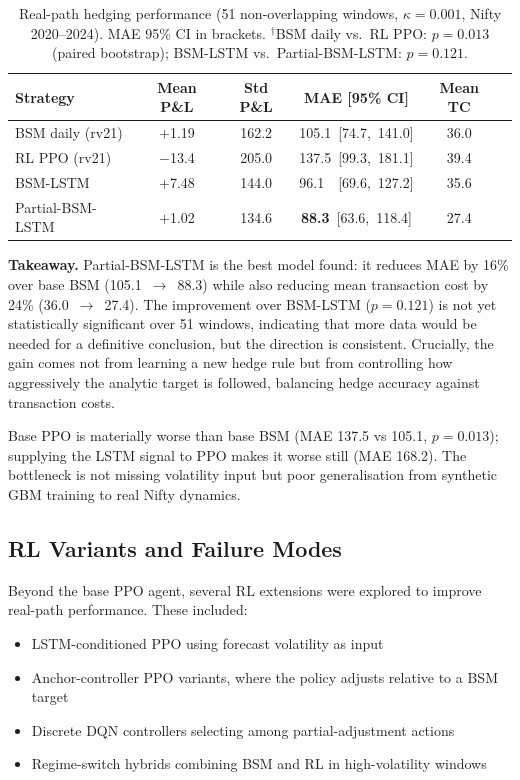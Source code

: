 \documentclass[10pt,a4paper]{article}
\begin{document}
\begin{table}[H]
\centering
\caption{Real-path hedging performance (51 non-overlapping windows,
         $\kappa=0.001$, Nifty 2020--2024).
         MAE 95\% CI in brackets.
         $^\dagger$BSM daily vs.\ RL PPO: $p=0.013$ (paired bootstrap);
         BSM-LSTM vs.\ Partial-BSM-LSTM: $p=0.121$.}
\label{tab:real}
\begin{tabular}{lccccc}
\toprule
Strategy & Mean P\&L & Std P\&L & MAE [95\% CI] & Mean TC \\
\midrule
BSM daily (rv21)  & $+$1.19  & 162.2 & 105.1\ [74.7,\ 141.0] & 36.0 \\
RL PPO (rv21)     & $-$13.4  & 205.0 & 137.5\ [99.3,\ 181.1] & 39.4 \\
BSM-LSTM          & $+$7.48  & 144.0 & 96.1\ \ [69.6,\ 127.2] & 35.6 \\
Partial-BSM-LSTM  & $+$1.02  & 134.6 & \textbf{88.3}\ [63.6,\ 118.4] & 27.4 \\
\bottomrule
\end{tabular}
\end{table}

\textbf{Takeaway.} Partial-BSM-LSTM is the best model found: it reduces MAE
by 16\% over base BSM (105.1~$\to$~88.3) while also reducing mean transaction cost
by 24\% (36.0~$\to$~27.4).  The improvement over BSM-LSTM ($p=0.121$) is not
yet statistically significant over 51 windows, indicating that more data would
be needed for a definitive conclusion, but the direction is consistent.
Crucially, the gain comes not from learning a new hedge rule but from
controlling how aggressively the analytic target is followed, balancing
hedge accuracy against transaction costs.

Base PPO is materially worse than base BSM (MAE 137.5 vs 105.1, $p=0.013$);
supplying the LSTM signal to PPO makes it worse still (MAE 168.2).
The bottleneck is not missing volatility input but poor generalisation from
synthetic GBM training to real Nifty dynamics.

\subsection*{RL Variants and Failure Modes}
Beyond the base PPO agent, several RL extensions were explored to improve
real-path performance. These included:

\begin{itemize}[leftmargin=*]
  \item LSTM-conditioned PPO using forecast volatility as input
  \item Anchor-controller PPO variants, where the policy adjusts relative to a
        BSM target
  \item Discrete DQN controllers selecting among partial-adjustment actions
  \item Regime-switch hybrids combining BSM and RL in high-volatility windows
\end{itemize}
\end{document}
